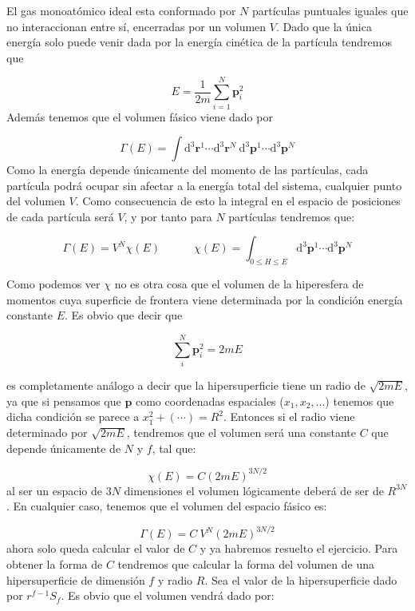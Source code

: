 \documentclass[12pt,a4paper]{article}
\numberwithin{equation}{section}
\numberwithin{figure}{section}
\newcommand{\tquad}{\quad \quad \quad}
\newcommand{\D}{\mathrm{d}}
\newcommand{\rn}{\mathbf{r}}
\newcommand{\pn}{\mathbf{p}}
\theoremstyle{definition}
\begin{document}
El gas monoatómico ideal esta conformado por $N$ partículas puntuales iguales que no interaccionan entre sí, encerradas por un volumen $V$. Dado que la única energía solo puede venir dada por la energía cinética de la partícula tendremos que

\begin{equation}
E = \frac{1}{2m} \sum_{i=1}^N \pn_i^2
\end{equation}
Además tenemos que el volumen fásico viene dado por

\begin{equation}
\Gamma (E) = \int \D^3 \rn^1 \cdots \D^3 \rn^N \ \D^3 \pn^1 \cdots \D^3 \pn^N
\end{equation}
Como la energía depende únicamente del momento de las partículas, cada partícula podrá ocupar sin afectar a la energía total del sistema, cualquier punto del volumen $V$. Como consecuencia de esto la integral en el espacio de posiciones de cada partícula será $V$, y por tanto para $N$ partículas tendremos que:

\begin{equation}
\Gamma (E) = V^N \chi (E) \tquad \chi (E) = \int_{0\leq H\leq E} \D^3 \pn^1 \cdots \D^3 \pn^N
\end{equation}

Como podemos ver $\chi$ no es otra cosa que el volumen de la hiperesfera de momentos cuya superficie de frontera viene determinada por la condición energía constante $E$. Es obvio que decir que	

$$  \sum_i^{N} \pn_i^2 = 2mE $$ 

es completamente análogo a decir que la hipersuperficie tiene un radio de $\sqrt{2mE}$, ya que si pensamos que $\pn$ como coordenadas espaciales ($x_1,x_2,...$) tenemos que dicha condición se parece a $x_1^2 + (\cdots) = R^2$. Entonces si el radio viene determinado por $\sqrt{2mE}$, tendremos que el volumen será una constante $C$ que depende únicamente de $N$ y $f$, tal que:

\begin{equation}
\chi(E) = C (2mE)^{3N/2}
\end{equation}
al ser un espacio de $3N$ dimensiones el volumen lógicamente deberá de ser de $R^{3N}$. En cualquier caso, tenemos que el volumen del espacio fásico es:

\begin{equation}
\Gamma (E) = C \ V^N (2mE)^{3N/2}
\end{equation}
ahora solo queda calcular el valor de $C$ y ya habremos resuelto el ejercicio. Para obtener la forma de $C$ tendremos que calcular la forma del volumen de una hipersuperficie de dimensión $f$ y radio $R$. Sea el valor de la hipersuperficie dado por $r^{f-1} S_f$. Es obvio que el volumen vendrá dado por:
\end{document}
